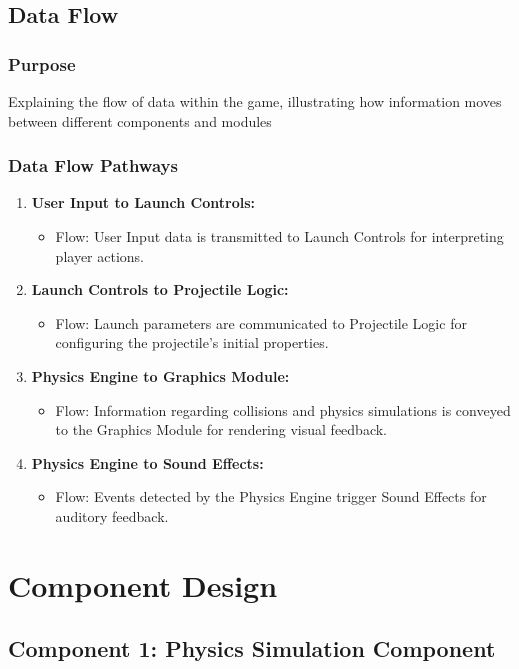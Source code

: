 \documentclass[12pt, titlepage]{article}
\begin{document}
\subsection{Data Flow}
\subsubsection{Purpose}
Explaining the flow of data within the game, illustrating how information moves between different components and modules

\subsubsection{Data Flow Pathways}
\begin{enumerate}
    \item \textbf{User Input to Launch Controls:}
    \begin{itemize}
        \item  Flow: User Input data is transmitted to Launch Controls for interpreting player actions.
    \end{itemize}
    \item \textbf{Launch Controls to Projectile Logic:}
    \begin{itemize}
        \item Flow: Launch parameters are communicated to Projectile Logic for configuring the projectile's initial properties.
    \end{itemize}
    \item \textbf{Physics Engine to Graphics Module:}
    \begin{itemize}
        \item Flow: Information regarding collisions and physics simulations is conveyed to the Graphics Module for rendering visual feedback.
    \end{itemize}
    \item \textbf{Physics Engine to Sound Effects:}
    \begin{itemize}
        \item Flow: Events detected by the Physics Engine trigger Sound Effects for auditory feedback.
    \end{itemize}
   
\end{enumerate}

\section{Component Design}
\subsection{Component 1: Physics Simulation Component}
\end{document}
